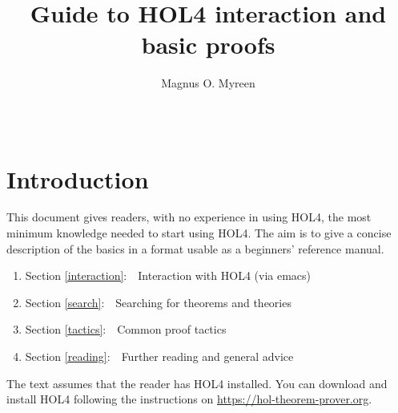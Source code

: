 \documentclass[a4paper,10pt]{article}
\begin{document}
\title{\bf\Large Guide to HOL4 interaction and basic proofs\vspace{-0.3em}}

\author{\normalsize Magnus O. Myreen}
\date{~\vspace{-2em}}

\maketitle

\newenvironment{code}{\begin{quote}%
\begin{alltt}\small}{%
\end{alltt}%
\end{quote}}
\newenvironment{enum}{\begin{enumerate}
\setlength{\itemsep}{-\parsep}
}{\end{enumerate}}

\renewcommand{\conj}{\(\begin{array}{c}\texttt{\bf\scriptsize/\textbackslash}\\[0.18em]\end{array}\)}
\newcommand{\mysec}[1]{\section{\large #1}}
\newcommand{\mysubsec}[1]{\subsection{\normalsize#1}}
\newcommand{\sq}{\textasciigrave}

\mysec{Introduction}

This document gives readers, with no experience in using HOL4, the most
minimum knowledge needed to start using HOL4. The aim is to give a
concise description of the basics in a format usable as a beginners'
reference manual.
\begin{enum}
\item[~] Section \ref{interaction}:~~Interaction with HOL4 (via emacs)
\item[~] Section \ref{search}:~~Searching for theorems and theories
\item[~] Section \ref{tactics}:~~Common proof tactics
\item[~] Section \ref{reading}:~~Further reading and general advice
\end{enum}
The text assumes that the reader has HOL4 installed. You can download and install HOL4 following the instructions on \url{https://hol-theorem-prover.org}.
\end{document}
